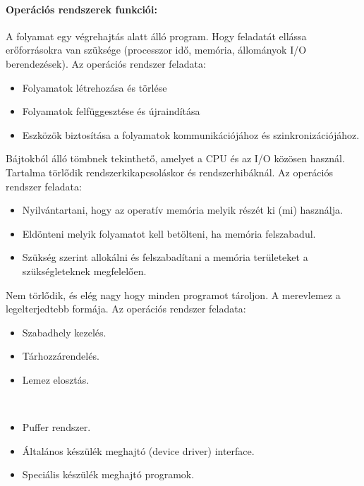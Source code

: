 \paragraph{Operációs rendszerek funkciói:}
\begin{description}[nosep]
\item[Folyamatkezelés]
A folyamat egy végrehajtás alatt álló program. Hogy feladatát ellássa erőforrásokra van szüksége (processzor idő, memória, állományok I/O berendezések).
Az operációs rendszer feladata:
\begin{itemize}[nosep]
	\item Folyamatok létrehozása és törlése
	\item Folyamatok felfüggesztése és újraindítása
	\item Eszközök biztosítása a folyamatok kommunikációjához és szinkronizációjához.
\end{itemize}
\item[Memória (főtár) kezelés]
Bájtokból álló tömbnek tekinthető, amelyet a CPU és az I/O közösen használ. Tartalma törlődik rendszerkikapcsoláskor és rendszerhibáknál.
Az operációs rendszer feladata:
\begin{itemize}[nosep]
	\item Nyilvántartani, hogy az operatív memória melyik részét ki (mi) használja.
	\item Eldönteni melyik folyamatot kell betölteni, ha memória felszabadul.
	\item Szükség szerint allokálni és felszabadítani a memória területeket a szükségleteknek megfelelően.
\end{itemize}
\item[Másodlagos tárkezelés]
Nem törlődik, és elég nagy hogy minden programot tároljon. A merevlemez a legelterjedtebb
formája. Az operációs rendszer feladata:
\begin{itemize}[nosep]
	\item Szabadhely kezelés.
	\item Tárhozzárendelés.
	\item Lemez elosztás.
\end{itemize}
\item[I/O rendszerkezelés] ~
\begin{itemize}[nosep]
	\item Puffer rendszer.
	\item Általános készülék meghajtó (device driver) interface.
	\item Speciális készülék meghajtó programok.
\end{itemize}

\end{description}
